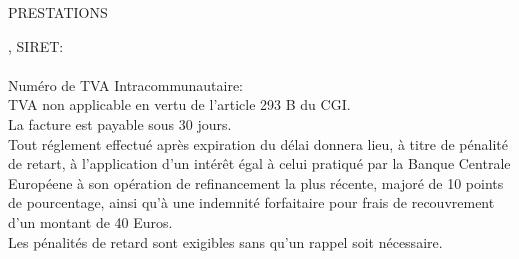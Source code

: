 \documentclass{invoice}
\begin{document}
\vspace{100 pt}

\hspace{8 pt}\color{gray}\MakeUppercase{Prestations}\\[-1.6ex]
\hline

\color{black}





\vspace{1 cm}
\vspace*{\fill}
\begin{center}
	\footnotesize{, SIRET: }\\
	\footnotesize{}\\
	\footnotesize{Numéro de TVA Intracommunautaire: }\\
	\footnotesize{
		TVA non applicable en vertu de l'article 293 B du CGI.
	}\\
	\footnotesize{La facture est payable sous 30 jours.}\\
	\footnotesize{Tout réglement effectué après expiration du délai donnera lieu, à titre de pénalité de retart, à l'application
		d'un intérêt égal à celui pratiqué par la Banque Centrale Européene à son opération de refinancement la plus récente,
		majoré de 10 points de pourcentage, ainsi qu'à une indemnité forfaitaire pour frais de recouvrement d'un montant de 40 Euros.}\\
	\footnotesize{Les pénalités de retard sont exigibles sans qu'un rappel soit nécessaire.}
\end{center}
\end{document}
